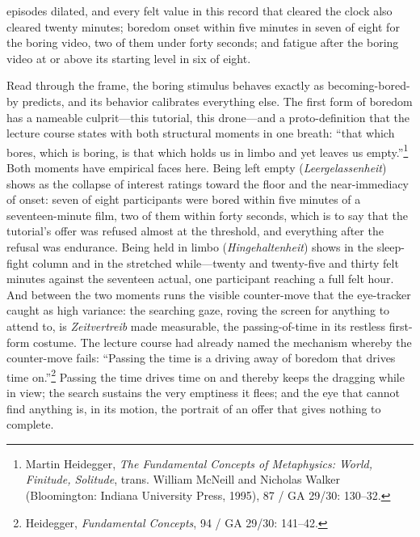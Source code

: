 \documentclass{article}
\begin{document}
episodes dilated, and every felt value in this record that cleared the clock also cleared twenty minutes; boredom onset within five minutes in seven of eight for the boring video, two of them under forty seconds; and fatigue after the boring video at or above its starting level in six of eight.

Read through the frame, the boring stimulus behaves exactly as becoming-bored-by predicts, and its behavior calibrates everything else. The first form of boredom has a nameable culprit---this tutorial, this drone---and a proto-definition that the lecture course states with both structural moments in one breath: ``that which bores, which is boring, is that which holds us in limbo and yet leaves us empty.''\footnote{Martin Heidegger, \textit{The Fundamental Concepts of Metaphysics: World, Finitude, Solitude}, trans. William McNeill and Nicholas Walker (Bloomington: Indiana University Press, 1995), 87 / GA 29/30: 130--32.} Both moments have empirical faces here. Being left empty (\textit{Leergelassenheit}) shows as the collapse of interest ratings toward the floor and the near-immediacy of onset: seven of eight participants were bored within five minutes of a seventeen-minute film, two of them within forty seconds, which is to say that the tutorial's offer was refused almost at the threshold, and everything after the refusal was endurance. Being held in limbo (\textit{Hingehaltenheit}) shows in the sleep-fight column and in the stretched while---twenty and twenty-five and thirty felt minutes against the seventeen actual, one participant reaching a full felt hour. And between the two moments runs the visible counter-move that the eye-tracker caught as high variance: the searching gaze, roving the screen for anything to attend to, is \textit{Zeitvertreib} made measurable, the passing-of-time in its restless first-form costume. The lecture course had already named the mechanism whereby the counter-move fails: ``Passing the time is a driving away of boredom that drives time on.''\footnote{Heidegger, \textit{Fundamental Concepts}, 94 / GA 29/30: 141--42.} Passing the time drives time on and thereby keeps the dragging while in view; the search sustains the very emptiness it flees; and the eye that cannot find anything is, in its motion, the portrait of an offer that gives nothing to complete.
\end{document}

